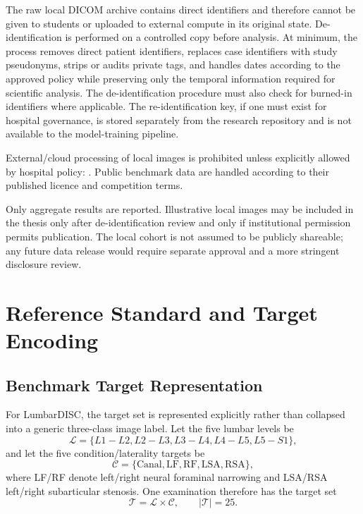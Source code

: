 The raw local DICOM archive contains direct identifiers and therefore cannot be
given to students or uploaded to external compute in its original state.
De-identification is performed on a controlled copy before analysis. At minimum,
the process removes direct patient identifiers, replaces case identifiers with
study pseudonyms, strips or audits private tags, and handles dates according to
the approved policy while preserving only the temporal information required for
scientific analysis. The de-identification procedure must also check for
burned-in identifiers where applicable. The re-identification key, if one must
exist for hospital governance, is stored separately from the research
repository and is not available to the model-training pipeline.

External/cloud processing of local images is prohibited unless explicitly
allowed by hospital policy:
. Public benchmark data are handled according to their published
licence and competition terms.

Only aggregate results are reported. Illustrative local images may be included
in the thesis only after de-identification review and only if institutional
permission permits publication. The local cohort is not assumed to be publicly
shareable; any future data release would require separate approval and a more
stringent disclosure review.


\section{Reference Standard and Target Encoding}
\label{sec:method-reference}

\subsection{Benchmark Target Representation}
\label{sec:method-benchmark-targets}

For LumbarDISC, the target set is represented explicitly rather than collapsed
into a generic three-class image label. Let the five lumbar levels be
\[
\mathcal{L}=\{L1\!-\!L2,L2\!-\!L3,L3\!-\!L4,L4\!-\!L5,L5\!-\!S1\},
\]
and let the five condition/laterality targets be
\[
\mathcal{C}=\{
\mathrm{Canal},
\mathrm{LF},
\mathrm{RF},
\mathrm{LSA},
\mathrm{RSA}
\},
\]
where LF/RF denote left/right neural foraminal narrowing and LSA/RSA
left/right subarticular stenosis. One examination therefore has the target set
\[
\mathcal{T}=\mathcal{L}\times\mathcal{C}, \qquad |\mathcal{T}|=25.
\]

